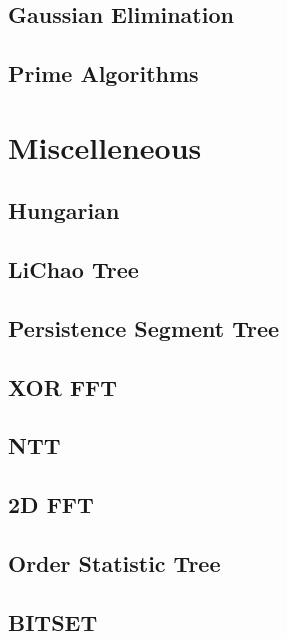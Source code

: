 \documentclass[10pt,landscape,a4paper,twocolumn]{article}
\begin{document}
\subsection{Gaussian Elimination}


\subsection{Prime Algorithms}



\section{Miscelleneous}

\subsection{Hungarian}


\subsection{LiChao Tree}


\subsection{Persistence Segment Tree}


\subsection{XOR FFT}


\subsection{NTT}


\subsection{2D FFT}


\subsection{Order Statistic Tree}


\subsection{BITSET}



\clearpage
\null
\clearpage
\null
\clearpage
\null
\clearpage
\null
\clearpage
\null
\end{document}
